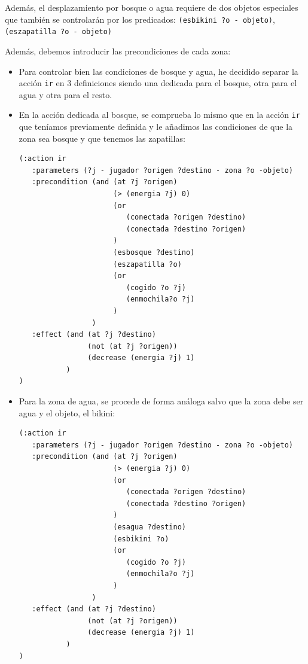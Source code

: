 \documentclass[a4paper, 11pt]{article}
\begin{document}
		Además, el desplazamiento por bosque o agua requiere de dos objetos especiales que también se
		controlarán por los predicados: \verb|(esbikini ?o - objeto)|, \verb|(eszapatilla ?o - objeto)|
		
		Además, debemos introducir las precondiciones de cada zona:
		\begin{itemize}
			\item Para controlar bien las condiciones de bosque y agua, he decidido separar la acción
			\verb|ir| en 3 definiciones siendo una dedicada para el bosque, otra para el agua y otra
			para el resto.
			
			\item En la acción dedicada al bosque, se comprueba lo mismo que en la acción \verb|ir| que
			teníamos previamente definida y le añadimos las condiciones de que la zona sea bosque y que
			tenemos las zapatillas:
			\begin{verbatim}
(:action ir
   :parameters (?j - jugador ?origen ?destino - zona ?o -objeto)
   :precondition (and (at ?j ?origen)
                      (> (energia ?j) 0)
                      (or
                         (conectada ?origen ?destino)
                         (conectada ?destino ?origen)
                      )
                      (esbosque ?destino)
                      (eszapatilla ?o)
                      (or
                         (cogido ?o ?j)
                         (enmochila?o ?j)
                      )
                 )
   :effect (and (at ?j ?destino)
                (not (at ?j ?origen))
                (decrease (energia ?j) 1)
           )
)
			\end{verbatim}

			\item Para la zona de agua, se procede de forma análoga salvo que la zona debe ser agua y el
			objeto, el bikini:
			\begin{verbatim}
(:action ir
   :parameters (?j - jugador ?origen ?destino - zona ?o -objeto)
   :precondition (and (at ?j ?origen)
                      (> (energia ?j) 0)
                      (or
                         (conectada ?origen ?destino)
                         (conectada ?destino ?origen)
                      )
                      (esagua ?destino)
                      (esbikini ?o)
                      (or
                         (cogido ?o ?j)
                         (enmochila?o ?j)
                      )
                 )
   :effect (and (at ?j ?destino)
                (not (at ?j ?origen))
                (decrease (energia ?j) 1)
           )
)
			\end{verbatim}


\end{itemize}
\end{document}
